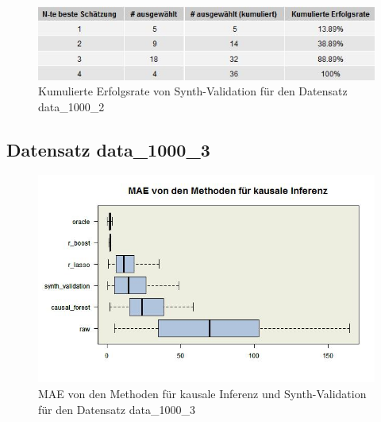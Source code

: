 \documentclass[12pt,a4paper,twoside]{scrartcl}
\numberwithin{equation}{section}
\newcounter{mypagecount}%
\newenvironment{interlude}{%
  \clearpage
  \setcounter{mypagecount}{\value{page}}%
  \thispagestyle{empty}%
  \pagestyle{empty}%
}{%
  \clearpage
  \setcounter{page}{\value{mypagecount}}%
}
\begin{document}
\begin{interlude}
\begin{appendices}
\begin{center}
\begin{figure}[H]
    \centering
    \includegraphics[height=0.2\textwidth, width=1\textwidth]{figures/plots/appendix/rawData1000bGrid.jpeg}
    \vspace{1mm}
    \caption[Kumulierte Erfolgsrate von Synth-Validation für den Datensatz data\_1000\_2]{Kumulierte Erfolgsrate von Synth-Validation für den Datensatz data\_1000\_2}
  \end{figure}
\end{center}

\subsection{Datensatz data\_1000\_3}

\begin{center}
\begin{figure}[H]
    \centering
    \includegraphics[height=0.5\textwidth, width=1\textwidth]{figures/plots/appendix/rawData1000cBoxplot.jpeg}
    \caption[MAE von den Methoden für kausale Inferenz und Synth-Validation für den Datensatz data\_1000\_3]{MAE von den Methoden für kausale Inferenz und Synth-Validation für den Datensatz data\_1000\_3}
  \end{figure}
\end{center}


\end{appendices}
\end{interlude}
\end{document}
